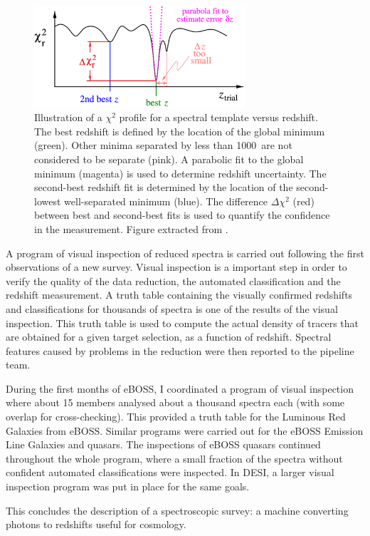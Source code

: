 \begin{figure}[t]
    \centering
    \includegraphics[width=0.7\textwidth]{fig/spectro/spec1d_chi2.png}
    \caption{Illustration of a $\chi^2$ profile for a spectral template versus redshift. 
    The best redshift is defined by the location of the global minimum (green). 
    Other minima separated by less than 1000~\kms are not considered to be separate (pink). 
    A parabolic fit to the global minimum (magenta) is used to determine redshift uncertainty. 
    The second-best redshift fit is determined by the location of the second-lowest well-separated minimum (blue). 
    The difference $\Delta \chi^2$ (red) between best and second-best fits is used 
    to quantify the confidence in the measurement.
    Figure extracted from \cite{boltonSpectralClassificationRedshift2012a}. }
    \label{fig:spec1d}
\end{figure}

A program of visual inspection of reduced spectra is carried out following the first observations 
of a new survey. 
Visual inspection is a important step in order to verify 
the quality of the data reduction, the automated classification and the redshift measurement. 
A truth table containing the visually confirmed redshifts and classifications
for thousands of spectra is one of the results of the visual inspection. 
This truth table is used to compute the actual density of tracers that are 
obtained for a given target selection, as a function of redshift. 
Spectral features caused by problems in the reduction were then reported to the
pipeline team. 

During the first months of eBOSS, I coordinated a program of 
visual inspection where about 15 members analysed about a thousand spectra each
(with some overlap for cross-checking). This provided a truth table
for the Luminous Red Galaxies from eBOSS. Similar programs were carried out
for the eBOSS Emission Line Galaxies and quasars. The inspections of eBOSS quasars
continued throughout the whole program, where a small fraction of
the spectra without confident automated classifications were inspected.
In DESI, a larger visual inspection program was put in place for the same goals.

This concludes the description of a spectroscopic survey: 
a machine converting photons to redshifts useful for cosmology.  